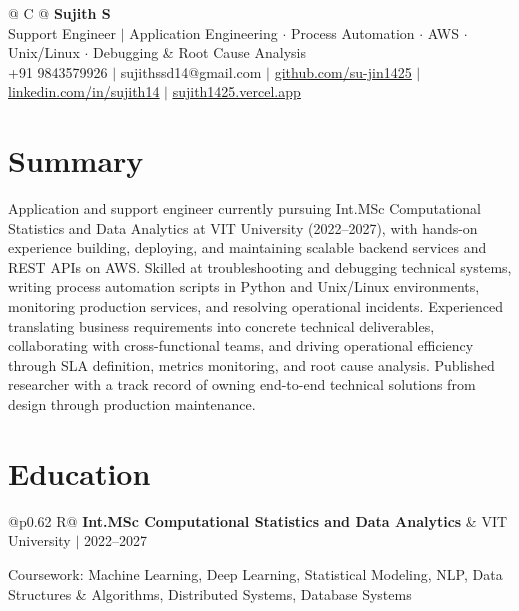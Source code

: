 \documentclass[a4paper,10pt]{article}
\newcommand{\ulink}[2]{\href{#1}{\uline{#2}}}
\newcommand{\subheading}[1]{{\color[HTML]{0A0A0A}\fontsize{12}{14}\selectfont\bfseries #1}}
\newcommand{\meta}[1]{{\color[HTML]{5C5C5C}\fontsize{10.5}{12.5}\selectfont #1}}
\begin{document}
\pagestyle{empty}

\begin{tabularx}{\linewidth}{@{} C @{}}
{\color[HTML]{000000}\fontsize{30}{35}\selectfont\bfseries Sujith S} \\[5pt]
{\fontsize{10.5}{12.5}\selectfont\color[HTML]{3A3A3A}
Support Engineer $|$ Application Engineering $\cdot$ Process Automation $\cdot$ AWS $\cdot$ Unix/Linux $\cdot$ Debugging \& Root Cause Analysis} \\[6pt]
{\fontsize{10.5}{12.5}\selectfont\textcolor[HTML]{3A3A3A}{
+91 9843579926 $|$
sujithssd14@gmail.com $|$
\ulink{https://github.com/su-jin1425}{github.com/su-jin1425} $|$
\ulink{https://linkedin.com/in/sujith14}{linkedin.com/in/sujith14} $|$
\ulink{https://sujith1425.vercel.app}{sujith1425.vercel.app}}}
\end{tabularx}

\vspace{2pt}

\section{Summary}
\vspace{5pt}
{\color[HTML]{0A0A0A}\fontsize{11}{14}\selectfont
Application and support engineer currently pursuing Int.MSc Computational Statistics and Data Analytics at VIT University (2022--2027), with hands-on experience building, deploying, and maintaining scalable backend services and REST APIs on AWS. Skilled at troubleshooting and debugging technical systems, writing process automation scripts in Python and Unix/Linux environments, monitoring production services, and resolving operational incidents. Experienced translating business requirements into concrete technical deliverables, collaborating with cross-functional teams, and driving operational efficiency through SLA definition, metrics monitoring, and root cause analysis. Published researcher with a track record of owning end-to-end technical solutions from design through production maintenance.}

\vspace{2pt}

\section{Education}
\vspace{2pt}

\begin{tabularx}{\linewidth}{@{}p{0.62\linewidth} R@{}}
\subheading{Int.MSc Computational Statistics and Data Analytics} & \meta{VIT University $|$ 2022--2027}
\end{tabularx}
\vspace{1pt}
{\color[HTML]{3A3A3A}\fontsize{11}{14}\selectfont Coursework: Machine Learning, Deep Learning, Statistical Modeling, NLP, Data Structures \& Algorithms, Distributed Systems, Database Systems}
\end{document}
